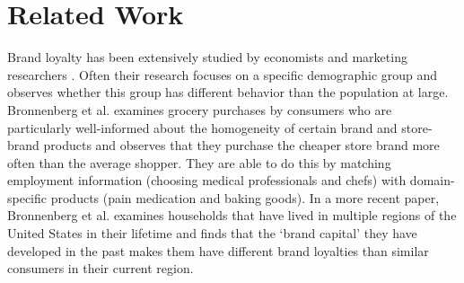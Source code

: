 \documentclass[conference]{IEEEtran}
\begin{document}
%




\section{Related Work}
Brand loyalty has been extensively studied by economists and marketing researchers\cite{KAMAKURA19939} \cite{bronnenberg2016formation}. Often their research focuses on a specific demographic group and observes whether this group has different behavior than the population at large. Bronnenberg et al.\cite{bronnenberg2014pharmacists} examines grocery purchases by consumers who are particularly well-informed about the homogeneity of certain brand and store-brand products and observes that they purchase the cheaper store brand more often than the average shopper. They are able to do this by matching employment information (choosing medical professionals and chefs) with domain-specific products (pain medication and baking goods). In a more recent paper, Bronnenberg et al.\cite{bronnenberg2012evolution} examines households that have lived in multiple regions of the United States in their lifetime and finds that the ‘brand capital’ they have developed in the past makes them have different brand loyalties than similar consumers in their current region.
\end{document}
